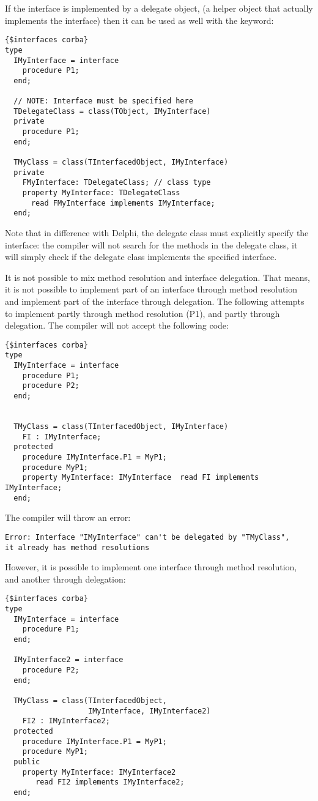If the interface is implemented by a delegate object, (a helper object that
actually implements the interface) then it can be used as well with the
 keyword:
\begin{verbatim}
{$interfaces corba}
type
  IMyInterface = interface
    procedure P1;
  end;

  // NOTE: Interface must be specified here
  TDelegateClass = class(TObject, IMyInterface)
  private
    procedure P1;
  end;
 
  TMyClass = class(TInterfacedObject, IMyInterface)
  private
    FMyInterface: TDelegateClass; // class type
    property MyInterface: TDelegateClass 
      read FMyInterface implements IMyInterface;
  end;
\end{verbatim}
Note that in difference with Delphi, the delegate class must explicitly
specify the interface: the compiler will not search for the methods in the
delegate class, it will simply check if the delegate class implements the
specified interface.

It is not possible to mix method resolution and interface delegation. 
That means, it is not possible to implement part of an interface through
method resolution and implement part of the interface through delegation. 
The following attempts to implement  partly through method
resolution (P1), and partly through delegation. The compiler will not accept
the following code:
\begin{verbatim}
{$interfaces corba}
type
  IMyInterface = interface
    procedure P1;
    procedure P2;
  end;


  TMyClass = class(TInterfacedObject, IMyInterface)
    FI : IMyInterface; 
  protected
    procedure IMyInterface.P1 = MyP1;
    procedure MyP1;
    property MyInterface: IMyInterface  read FI implements IMyInterface;
  end;
\end{verbatim}
The compiler will throw an error:
\begin{verbatim}
Error: Interface "IMyInterface" can't be delegated by "TMyClass", 
it already has method resolutions
\end{verbatim}

However, it is possible to implement one interface through method
resolution, and another through delegation:
\begin{verbatim}
{$interfaces corba}
type
  IMyInterface = interface
    procedure P1;
  end;

  IMyInterface2 = interface
    procedure P2;
  end;

  TMyClass = class(TInterfacedObject, 
                   IMyInterface, IMyInterface2)
    FI2 : IMyInterface2;
  protected
    procedure IMyInterface.P1 = MyP1;
    procedure MyP1;
  public 
    property MyInterface: IMyInterface2
       read FI2 implements IMyInterface2;
  end;
\end{verbatim}

